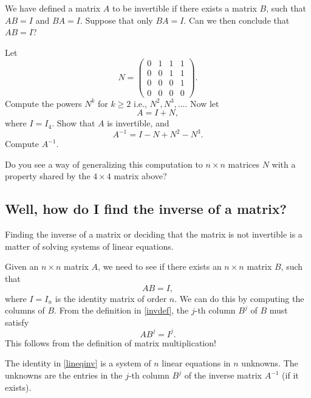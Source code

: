 \documentclass{article}
\begin{document}
\beginshex

  We have defined a matrix $A$ to be invertible if there exists a matrix $B$, such that
  $A B = I$ and $B A = I$. Suppose that only $B A = I$. Can we then conclude that $A B = I$?

\endshex


\beginshex
Let
$$
N =
\begin{pmatrix}
  0 & 1 & 1 & 1\\
  0 & 0 & 1 & 1\\
  0 & 0 & 0 & 1\\
  0 & 0 & 0 & 0
\end{pmatrix}.
$$
Compute the powers $N^k$ for $k\geq 2$ i.e., $N^2, N^3, \dots$. Now let
$$
A = I + N,
$$
where $I = I_4$.
Show that $A$ is invertible, and
$$
A^{-1} = I - N + N^2 - N^3.
$$
Compute $A^{-1}$.

Do you see a way of generalizing this computation to 
$n\times n$ matrices $N$ with a property shared by the
$4\times 4$ matrix above?

\endshex

\subsection{Well, how do I find the inverse of a matrix?}

Finding the inverse of a matrix or deciding that the matrix is not invertible is
a matter of solving systems of linear equations.

Given an $n\times n$ matrix $A$, we need to see if there exists an $n\times n$ matrix
$B$, such that
\begin{equation}\label{invdef}
A B = I,
\end{equation}
where $I = I_n$ is the identity matrix of order $n$. We can do this by
computing the columns of $B$. From the definition in \eqref{invdef}, the
$j$-th column $B^j$ of $B$ must satisfy
\begin{equation}\label{lineqinv}
A B^j = I^j.
\end{equation}
This follows from the definition of matrix multiplication!

The identity in \eqref{lineqinv} is a system of $n$ linear equations
in $n$ unknowns. The unknowns are the entries in the $j$-th column
$B^j$ of the inverse matrix $A^{-1}$ (if it exists).
\end{document}
